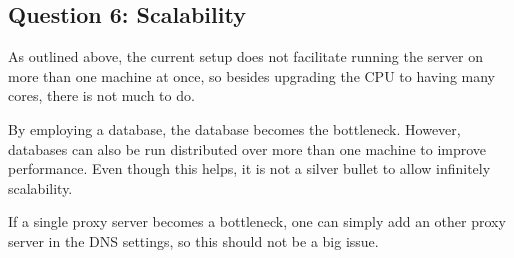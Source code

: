 \documentclass[11pt,a4paper,english]{article}
\begin{document}
\subsection{Question 6: Scalability}

As outlined above, the current setup does not facilitate running the server on
more than one machine at once, so besides upgrading the CPU to having many
cores, there is not much to do.

By employing a database, the database becomes the bottleneck. However, databases
can also be run distributed over more than one machine to improve
performance. Even though this helps, it is not a silver bullet to allow
infinitely scalability.

If a single proxy server becomes a bottleneck, one can simply add an other proxy
server in the DNS settings, so this should not be a big issue.

%
%



\end{document}
